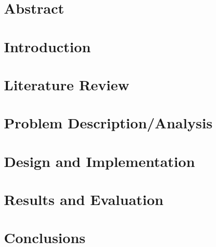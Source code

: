 \documentclass[a4paper, 11pt]{report}
\begin{document}

\chapter*{Abstract}

\tableofcontents
\chapter{Introduction} %

\chapter{Literature Review} %

\chapter{Problem Description/Analysis} %

\chapter{Design and Implementation}
\chapter{Results and Evaluation}
\chapter{Conclusions}
{}


%
\end{document}
